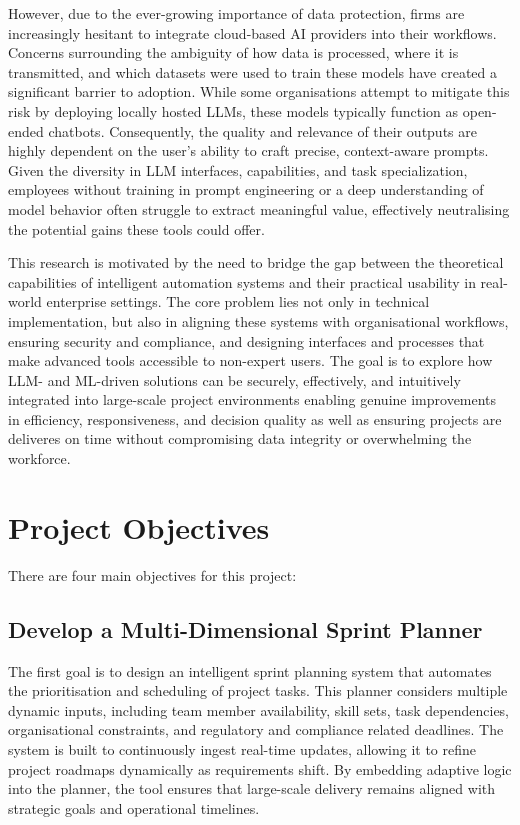 \documentclass{report}
\begin{document}
However, due to the ever-growing importance of data protection, firms are increasingly hesitant to integrate cloud-based AI providers into their workflows. Concerns surrounding the ambiguity of how data is processed, where it is transmitted, and which datasets were used to train these models have created a significant barrier to adoption. While some organisations attempt to mitigate this risk by deploying locally hosted LLMs, these models typically function as open-ended chatbots. Consequently, the quality and relevance of their outputs are highly dependent on the user's ability to craft precise, context-aware prompts. Given the diversity in LLM interfaces, capabilities, and task specialization, employees without training in prompt engineering or a deep understanding of model behavior often struggle to extract meaningful value, effectively neutralising the potential gains these tools could offer.

This research is motivated by the need to bridge the gap between the theoretical capabilities of intelligent automation systems and their practical usability in real-world enterprise settings. The core problem lies not only in technical implementation, but also in aligning these systems with organisational workflows, ensuring security and compliance, and designing interfaces and processes that make advanced tools accessible to non-expert users. The goal is to explore how LLM- and ML-driven solutions can be securely, effectively, and intuitively integrated into large-scale project environments enabling genuine improvements in efficiency, responsiveness, and decision quality as well as ensuring projects are deliveres on time without compromising data integrity or overwhelming the workforce.


\section{Project Objectives}

There are four main objectives for this project:
\subsection{Develop a Multi-Dimensional Sprint Planner}
The first goal is to design an intelligent sprint planning system that automates the prioritisation and scheduling of project tasks. This planner considers multiple dynamic inputs, including team member availability, skill sets, task dependencies, organisational constraints, and regulatory and compliance related deadlines. The system is built to continuously ingest real-time updates, allowing it to refine project roadmaps dynamically as requirements shift. By embedding adaptive logic into the planner, the tool ensures that large-scale delivery remains aligned with strategic goals and operational timelines.
\end{document}
